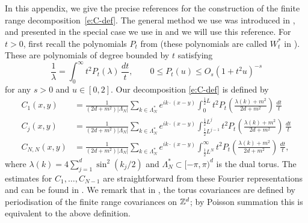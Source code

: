 \documentclass[11pt]{amsart}
\numberwithin{equation}{section}
\numberwithin{theorem}{section}
\newcommand{\1}{{\bf 1}}
\begin{document}
In this appendix, we give the precise references for the construction of the finite range decomposition~\eqref{e:C-def}.
The general method we use was introduced in \cite{MR3129804}, and presented in the special case we use in \cite[Chapter~3]{MR3969983}
and we will use this reference.
For $t>0$, first recall the polynomials $P_t$ from \cite[Chapter~3]{MR3969983} (these polynomials are called $W_t^*$ in \cite{MR3129804}).
These are polynomials of degree bounded by $t$ satisfying
\begin{equation} \label{e:decomp-Pt}
  \frac{1}{\lambda} = \int_{0}^\infty t^2 P_t(\lambda) \, \frac{dt}{t},
  \qquad
  0 \leq P_t(u) \leq O_s(1+t^2u)^{-s}
\end{equation}
for any $s>0$ and $u \in [0,2]$.
Our decomposition \eqref{e:C-def} is defined by
\begin{align}
  C_1(x,y) &= \frac{1}{(2d+m^2)|\Lambda_N|}\sum_{k \in \Lambda_N^*}  e^{ik\cdot(x-y)} \int_{0}^{\frac12 L} t^2 P_t(\frac{\lambda(k)+m^2}{2d+m^2}) \, \frac{dt}{t} 
  \\
  C_j(x,y) &= \frac{1}{(2d+m^2)|\Lambda_N|}\sum_{k \in \Lambda_N^*}  e^{ik\cdot(x-y)} \int_{\frac12 L^{j-1}}^{\frac12 L^j} t^2 P_t(\frac{\lambda(k)+m^2}{2d+m^2}) \, \frac{dt}{t}
  \\
  C_{N,N}(x,y) &= \frac{1}{(2d+m^2)|\Lambda_N|}\sum_{k \in \Lambda_N^*} e^{ik\cdot(x-y)} \int_{\frac12 L^N}^\infty t^2 P_t(\frac{\lambda(k)+m^2}{2d+m^2}) \, \frac{dt}{t},
\end{align}
where $\lambda(k) = 4\sum_{j=1}^{d}\sin^{2}(k_{j}/2)$ and
$\Lambda_N^* \subset [-\pi,\pi)^d$ is the dual torus.  The estimates
for $C_1, \dots, C_{N-1}$ are straightforward from these Fourier
representations and can be found in
\cite[Chapter~3]{MR3969983}. We remark that in
\cite[Section~3.4]{MR3969983}, the torus covariances are defined by
periodisation of the finite range covariances on $\mathbb{Z}^d$; by Poisson
summation this is equivalent to the above definition.
\end{document}

